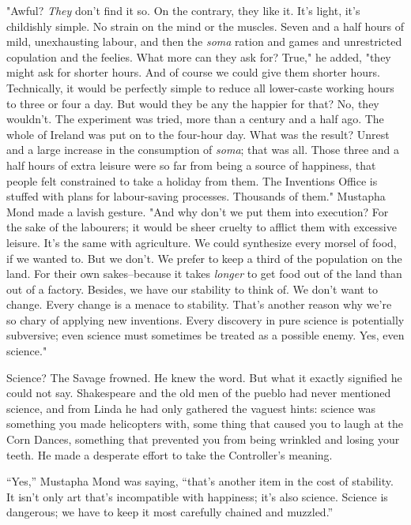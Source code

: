 \documentclass[12pt]{report}
\begin{document}
"Awful? \emph{They} don't find it so. On the contrary, they like it.
It's light, it's childishly simple. No strain on the mind or the
muscles. Seven and a half hours of mild, unexhausting labour, and then
the \emph{soma} ration and games and unrestricted copulation and the
feelies. What more can they ask for? True," he added, "they might ask
for shorter hours. And of course we could give them shorter hours.
Technically, it would be perfectly simple to reduce all lower-caste
working hours to three or four a day. But would they be any the happier
for that? No, they wouldn't. The experiment was tried, more than a
century and a half ago. The whole of Ireland was put on to the four-hour
day. What was the result? Unrest and a large increase in the consumption
of \emph{soma}; that was all. Those three and a half hours of extra
leisure were so far from being a source of happiness, that people felt
constrained to take a holiday from them. The Inventions Office is
stuffed with plans for labour-saving processes. Thousands of them."
Mustapha Mond made a lavish gesture. "And why don't we put them into
execution? For the sake of the labourers; it would be sheer cruelty to
afflict them with excessive leisure. It's the same with agriculture. We
could synthesize every morsel of food, if we wanted to. But we don't. We
prefer to keep a third of the population on the land. For their own
sakes--because it takes \emph{longer} to get food out of the land than
out of a factory. Besides, we have our stability to think of. We don't
want to change. Every change is a menace to stability. That's another
reason why we're so chary of applying new inventions. Every discovery in
pure science is potentially subversive; even science must sometimes be
treated as a possible enemy. Yes, even science."

Science? The Savage frowned. He knew the word. But what it exactly
signified he could not say. Shakespeare and the old men of the pueblo
had never mentioned science, and from Linda he had only gathered the
vaguest hints: science was something you made helicopters with, some
thing that caused you to laugh at the Corn Dances, something that
prevented you from being wrinkled and losing your teeth. He made a
desperate effort to take the Controller's meaning.

``Yes,'' Mustapha Mond was saying, ``that's another item in the cost of
stability. It isn't only art that's incompatible with happiness; it's
also science. Science is dangerous; we have to keep it most carefully
chained and muzzled.''
\end{document}

